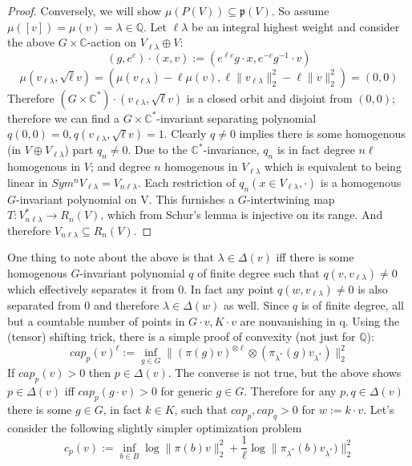 \documentclass{article}
\newcommand{\C}{{\mathbb{C}}}
\newcommand{\Q}{{\mathbb{Q}}}
\begin{document}
\begin{proof}
Conversely, we will show $\mu(P(V)) \subseteq \mathfrak{p}(V)$. So assume $\mu([v]) = \mu(v) = \lambda \in \Q$. Let $\ell \lambda$ be an integral highest weight and consider the above $G \times \C$-action on $V_{\ell \lambda} \oplus V$:
\[ (g, e^{c}) \cdot (x,v) := (e^{\ell c} g \cdot x, e^{-c} g^{-1} \cdot v)    \]
\[ \mu(v_{\ell \lambda}, \sqrt{\ell} v) = (\mu(v_{\ell \lambda}) - \ell \mu(v), \ell \|v_{\ell \lambda}\|_{2}^{2} - \ell \|v\|_{2}^{2}) = (0,0) \]
Therefore $(G \times \C^{*}) \cdot (v_{\ell \lambda}, \sqrt{\ell} v)$ is a closed orbit and disjoint from $(0,0)$; therefore we can find a $G \times \C^{*}$-invariant separating polynomial $q(0,0) = 0, q(v_{\ell \lambda}, \sqrt{\ell} v) = 1$. Clearly $q \neq 0$ implies there is some homogenous (in $V \oplus V_{\ell \lambda}$) part $q_{n} \neq 0$. Due to the $\C^{*}$-invariance, $q_{n}$ is in fact degree $n \ell$ homogenous in $V$; and degree $n$ homogenous in $V_{\ell \lambda}$ which is equivalent to being linear in $Sym^{n} V_{\ell \lambda} = V_{n \ell \lambda}$. Each restriction of $q_{n}(x \in V_{\ell \lambda}, \cdot)$ is a homogenous $G$-invariant polynomial on V. This furnishes a $G$-intertwining map $T : V_{n \ell \lambda}^{*} \to R_{n}(V)$, which from Schur's lemma is injective on its range. And therefore $V_{n \ell \lambda} \subseteq R_{n}(V)$. 
\end{proof}

One thing to note about the above is that $\lambda \in \Delta(v)$ iff there is some homogenous $G$-invariant polynomial $q$ of finite degree such that $q(v,v_{\ell \lambda}) \neq 0$ which effectively separates it from $0$. In fact any point $q(w,v_{\ell \lambda}) \neq 0$ is also separated from $0$ and therefore $\lambda \in \Delta(w)$ as well. Since $q$ is of finite degree, all but a countable number of points in $G \cdot v, K \cdot v$ are nonvanishing in q. Using the (tensor) shifting trick, there is a simple proof of convexity (not just for $\Q$): 
\[ cap_{p}(v)^{\ell} := \inf_{g \in G} \|(\pi(g) v)^{\otimes \ell} \otimes (\pi_{\lambda^{*}}(g) v_{\lambda^{*}}) \|_{2}^{2}    \]
If $cap_{p}(v) > 0$ then $p \in \Delta(v)$. The converse is not true, but the above shows $p \in \Delta(v)$ iff $cap_{p}(g \cdot v) > 0$ for generic $g \in G$. Therefore for any $p,q \in \Delta(v)$ there is some $g \in G$, in fact $k \in K$, such that $cap_{p},cap_{q} > 0$ for $w := k \cdot v$. Let's consider the following slightly simpler optimization problem
\[ c_{p}(v) := \inf_{b \in B} \log \|\pi(b) v\|_{2}^{2} + \frac{1}{\ell} \log \|\pi_{\lambda^{*}}(b) v_{\lambda^{*}}) \|_{2}^{2} \]
\end{document}
